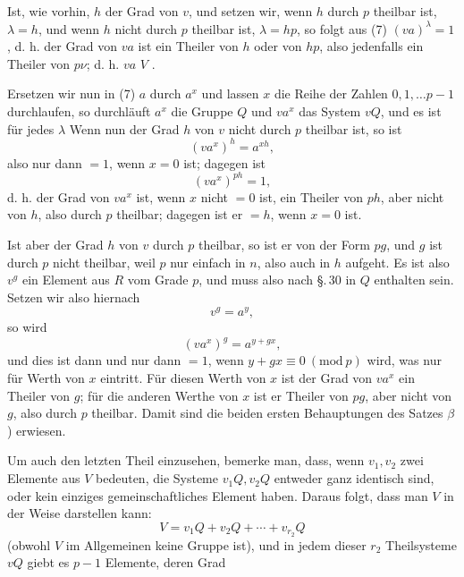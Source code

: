 Ist, wie vorhin, $h$ der Grad von $v$, und setzen wir, wenn $h$ durch $p$ theilbar ist, $\lambda = h$, und wenn $h$ nicht durch $p$ theilbar ist, $\lambda = hp$, so folgt aus (7) $(va)^\lambda = 1$, d. h. der Grad von $va$ ist ein Theiler von $h$ oder von $hp$, also jedenfalls ein Theiler von $p\nu$; d. h. $va$  $V$ .

Ersetzen wir nun in (7) $a$ durch $a^x$ und lassen $x$ die Reihe der Zahlen $0, 1, \ldots p-1$ durchlaufen, so durchläuft $a^x$ die Gruppe $Q$ und $va^x$ das System $vQ$, und es ist für jedes $\lambda$
Wenn nun der Grad $h$ von $v$ nicht durch $p$ theilbar ist, so ist
\[
(va^x)^h = a^{xh},
\]
also nur dann $= 1$, wenn $x = 0$ ist; dagegen ist
\[
(va^x)^{ph} = 1,
\]
d. h. der Grad von $va^x$ ist, wenn $x$ nicht $= 0$ ist, ein Theiler von $ph$, aber nicht von $h$, also durch $p$ theilbar; dagegen ist er $= h$, wenn $x = 0$ ist.

Ist aber der Grad $h$ von $v$ durch $p$ theilbar, so ist er von der Form $pg$, und $g$ ist durch $p$ nicht theilbar, weil $p$ nur einfach in $n$, also auch in $h$ aufgeht. Es ist also $v^g$ ein Element aus $R$ vom Grade $p$, und muss also nach \S.\,30 in $Q$ enthalten sein. Setzen wir also hiernach
\[
v^g = a^y,
\]
so wird
\[
(va^x)^g = a^{y+gx},
\]
und dies ist dann und nur dann $= 1$, wenn $y + gx \equiv 0 \ (\mathrm{mod}\ p)$ wird, was nur für  Werth von $x$ eintritt. Für diesen Werth von $x$ ist der Grad von $va^x$ ein Theiler von $g$; für die anderen Werthe von $x$ ist er Theiler von $pg$, aber nicht von $g$, also durch $p$ theilbar. Damit sind die beiden ersten Behauptungen des Satzes $\beta$) erwiesen.

Um auch den letzten Theil einzusehen, bemerke man, dass, wenn $v_1, v_2$ zwei Elemente aus $V$ bedeuten, die Systeme $v_1 Q, v_2 Q$ entweder ganz identisch sind, oder kein einziges gemeinschaftliches Element haben. Daraus folgt, dass man $V$ in der Weise darstellen kann:
\[
V = v_1 Q + v_2 Q + \cdots + v_{r_2} Q
\]
(obwohl $V$ im Allgemeinen keine Gruppe ist), und in jedem dieser $r_2$ Theilsysteme $vQ$ giebt es $p-1$ Elemente, deren Grad
